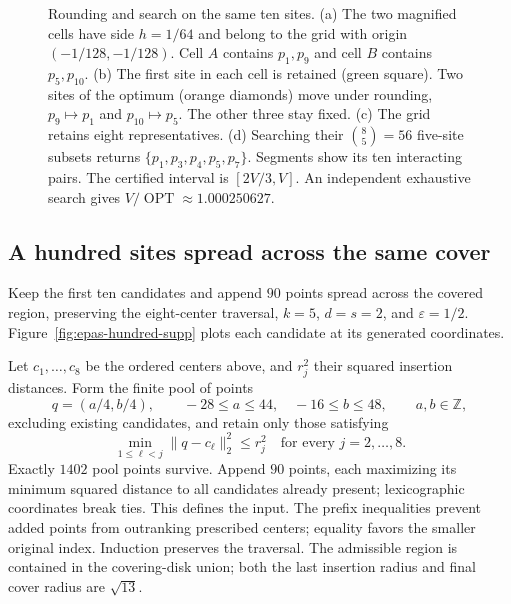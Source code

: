 \documentclass[a4paper,12pt]{article}
\newcommand{\OPT}{\operatorname{OPT}}
\numberwithin{equation}{section}
\begin{document}
\begin{figure}[!htbp]
\caption[Five of ten sites: grid and selection]{Rounding and search on the same ten sites.
(a) The two magnified cells have side $h=1/64$ and belong to the grid with origin
$(-1/128,-1/128)$. Cell $A$ contains $p_1,p_9$ and cell $B$ contains $p_5,p_{10}$.
(b) The first site in each cell is retained (green square). Two sites of the optimum
(orange diamonds) move under rounding, $p_9\mapsto p_1$ and $p_{10}\mapsto p_5$.
The other three stay fixed. (c) The grid retains eight representatives.
(d) Searching their $\binom85=56$ five-site subsets returns $\{p_1,p_3,p_4,p_5,p_7\}$.
Segments show its ten interacting pairs. The certified interval is $[2V/3,V]$.
An independent exhaustive search gives $V/\OPT\approx1.000250627$.}
\label{fig:epas-grid-run}
\end{figure}

\FloatBarrier


\subsection{A hundred sites spread across the same cover}\label{sec:epas-hundred}
Keep the first ten candidates and append $90$ points spread across the covered region, preserving
the eight-center traversal, $k=5$, $d=s=2$, and $\varepsilon=1/2$.
Figure~\ref{fig:epas-hundred-supp} plots each candidate at its generated coordinates.

Let $c_1,\ldots,c_8$ be the ordered centers above, and $r_j^2$ their squared insertion distances.
Form the finite pool of points
\[
 q=(a/4,b/4),\qquad -28\le a\le44,\quad -16\le b\le48,
 \qquad a,b\in\mathbb Z,
\]
excluding existing candidates, and retain only those satisfying
\[
 \min_{1\le\ell<j}\|q-c_\ell\|_2^2\le r_j^2
 \quad\text{for every }j=2,\ldots,8.
\]
Exactly $1402$ pool points survive. Append $90$ points, each maximizing its minimum squared
distance to all candidates already present; lexicographic coordinates break ties. This defines the
input. The prefix inequalities prevent added points from outranking prescribed centers; equality
favors the smaller original index. Induction preserves the traversal. The admissible region is
contained in the covering-disk union; both the last insertion radius and final cover radius are
$\sqrt{13}$.
\end{document}
